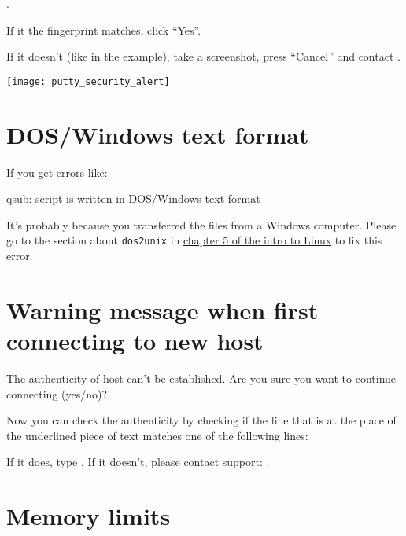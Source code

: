 \puttyFirstConnect

.

If it the fingerprint matches, click ``Yes''.

If it doesn't (like in the example), take a screenshot, press ``Cancel'' and contact \hpcinfo.


\texttt{[image: putty\_security\_alert]}


\fi


\section{DOS/Windows text format}

If you get errors like:

\begin{prompt}
qsub:  script is written in DOS/Windows text format
\end{prompt}

It's probably because you transferred the files from a Windows computer.
Please go to the section about \verb|dos2unix| in \href{\LinuxManualURL#sec:dos2unix}{chapter 5 of the intro to Linux}
to fix this error.

\section{Warning message when first connecting to new host}
\label{sec:warning-message-new-host}

\ifmacORlinux
\begin{prompt}
The authenticity of host %
can't be established.
Are you sure you want to continue connecting (yes/no)?
\end{prompt}

Now you can check the authenticity by checking if the line that is at the place
of the underlined piece of text matches one of the following lines:
\begin{prompt}
\end{prompt}

If it does, type  . If it doesn't, please contact support: \hpcinfo.
\else
\firsttimeconnection
\fi

\section{Memory limits}

